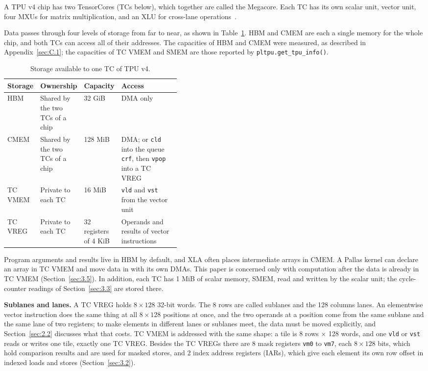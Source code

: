 \documentclass[sigconf,nonacm,balance=false]{acmart}
\newcommand{\code}[1]{\texttt{#1}}
\begin{document}
A TPU v4 chip has two TensorCores (TCs below), which together are called the Megacore. Each TC has its own scalar unit, vector unit, four MXUs for matrix multiplication, and an XLU for cross-lane operations~\cite{norrie2021tpuv2,jouppi2023tpuv4}.

Data passes through four levels of storage from far to near, as shown in Table~\ref{tab:1}. HBM and CMEM are each a single memory for the whole chip, and both TCs can access all of their addresses. The capacities of HBM and CMEM were measured, as described in Appendix~\ref{sec:C.1}; the capacities of TC VMEM and SMEM are those reported by \code{pltpu.\allowbreak{}get\_\allowbreak{}tpu\_\allowbreak{}info(\allowbreak{})}.

\begin{table}
\centering
\caption{Storage available to one TC of TPU v4.}
\label{tab:1}
\begin{tabular}{lll>{\raggedright\arraybackslash}p{0.408\linewidth}}
\toprule
Storage & Ownership & Capacity & Access \\
\midrule
HBM & Shared by the two TCs of a chip & 32 GiB & DMA only \\
CMEM & Shared by the two TCs of a chip & 128 MiB & DMA; or \code{cld} into the queue \code{crf}, then \code{vpop} into a TC VREG \\
TC VMEM & Private to each TC & 16 MiB & \code{vld} and \code{vst} from the vector unit \\
TC VREG & Private to each TC & 32 registers of 4 KiB & Operands and results of vector instructions \\
\bottomrule
\end{tabular}
\end{table}

Program arguments and results live in HBM by default, and XLA often places intermediate arrays in CMEM. A Pallas kernel can declare an array in TC VMEM and move data in with its own DMAs. This paper is concerned only with computation after the data is already in TC VMEM (Section~\ref{sec:3.5}). In addition, each TC has 1 MiB of scalar memory, SMEM, read and written by the scalar unit; the cycle-counter readings of Section~\ref{sec:3.3} are stored there.

\textbf{Sublanes and lanes.} A TC VREG holds $8 \times 128$ 32-bit words. The 8 rows are called sublanes and the 128 columns lanes. An elementwise vector instruction does the same thing at all $8 \times 128$ positions at once, and the two operands at a position come from the same sublane and the same lane of two registers; to make elements in different lanes or sublanes meet, the data must be moved explicitly, and Section~\ref{sec:2.2} discusses what that costs. TC VMEM is addressed with the same shape: a tile is 8 rows $\times$ 128 words, and one \code{vld} or \code{vst} reads or writes one tile, exactly one TC VREG. Besides the TC VREGs there are 8 mask registers \code{vm0} to \code{vm7}, each $8 \times 128$ bits, which hold comparison results and are used for masked stores, and 2 index address registers (IARs), which give each element its own row offset in indexed loads and stores (Section~\ref{sec:3.2}).
\end{document}

